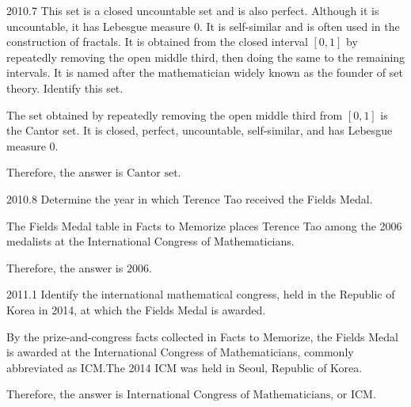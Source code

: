     \begin{pastproblem}{2010.7}
        This set is a closed uncountable set and is also perfect. Although it is uncountable, it has
        Lebesgue measure $0$. It is self-similar and is often used in the construction of fractals.
        It is obtained from the closed interval $[0,1]$ by repeatedly removing the open middle
        third, then doing the same to the remaining intervals. It is named after the mathematician
        widely known as the founder of set theory. Identify this set.
    \end{pastproblem}

    \begin{solution}
        The set obtained by repeatedly removing the open middle third from $[0,1]$ is the Cantor
        set. It is closed, perfect, uncountable, self-similar, and has Lebesgue measure $0$.

        Therefore, the answer is $\boxed{\text{Cantor set}}$.
    \end{solution}

    \begin{pastproblem}{2010.8}
        Determine the year in which Terence Tao received the Fields Medal.
    \end{pastproblem}

    \begin{solution}
        The Fields Medal table in Facts to Memorize places Terence Tao among the
        2006 medalists at the International Congress of Mathematicians.

        Therefore, the answer is $\boxed{2006}$.
    \end{solution}

    \begin{pastproblem}{2011.1}
        Identify the international mathematical congress, held in the Republic of Korea in 2014, at which the
        Fields Medal is awarded.
    \end{pastproblem}

    \begin{solution}
        By the prize-and-congress facts collected in Facts to Memorize, the Fields
        Medal is awarded at the International Congress of Mathematicians, commonly
        abbreviated as ICM.\@ The 2014 ICM was held in Seoul, Republic of Korea.

        Therefore, the answer is $\boxed{\text{International Congress of Mathematicians, or ICM}}$.
    \end{solution}

